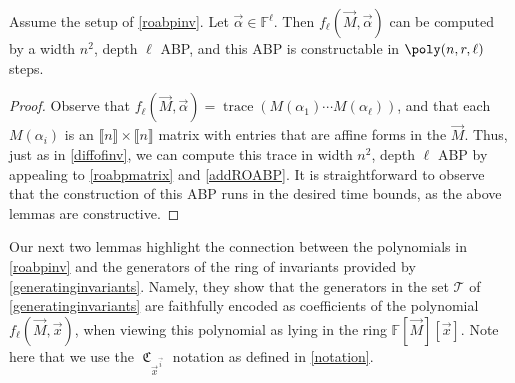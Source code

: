 \documentclass[letterpaper,11pt]{article}
\numberwithin{equation}{section}
\theoremstyle{plain}
\theoremstyle{remark}
\newcommand{\zr}[1]{{\llbracket {#1}\rrbracket}}
\DeclareMathOperator{\tr}{trace}
\DeclareMathOperator{\coeffo}{\mathfrak{C}}
\newcommand{\coeff}[1]{\coeffo_{#1}}
\newcommand{\F}{\mathbb{F}}
\newcommand{\cT}{\mathcal{T}}
\begin{document}
\begin{lemma}
	\label{explicitinv}
	Assume the setup of \autoref{roabpinv}. Let $\vec{\alpha}\in\F^\ell$. Then $f_\ell(\vec{M},\vec{\alpha})$ can be computed by a width $n^2$, depth $\ell$ ABP, and this ABP is constructable in $\poly(n,r,\ell)$ steps.
\end{lemma}
\begin{proof}
	Observe that $f_\ell(\vec{M},\vec{\alpha})=\tr(M(\alpha_1)\cdots M(\alpha_\ell))$, and that each $M(\alpha_i)$ is an $\zr{n}\times\zr{n}$ matrix with entries that are affine forms in the $\vec{M}$. Thus, just as in \autoref{diffofinv}, we can compute this trace in width $n^2$, depth $\ell$ ABP by appealing to \autoref{roabpmatrix} and \autoref{addROABP}.  It is straightforward to observe that the construction of this ABP runs in the desired time bounds, as the above lemmas are constructive.
\end{proof}

Our next two lemmas highlight the connection between the polynomials in \autoref{roabpinv} and the generators of the ring of invariants provided by \autoref{generatinginvariants}. Namely, they show that the generators in the set $\cT$ of \autoref{generatinginvariants} are faithfully encoded as coefficients of the polynomial $f_\ell(\vec{M},\vec{x})$, when viewing this polynomial as lying in the ring $\F[\vec{M}][\vec{x}]$. Note here that we use the $\coeff{\vec{x}^{\vec{i}}}$ notation as defined in \autoref{notation}.
\end{document}

